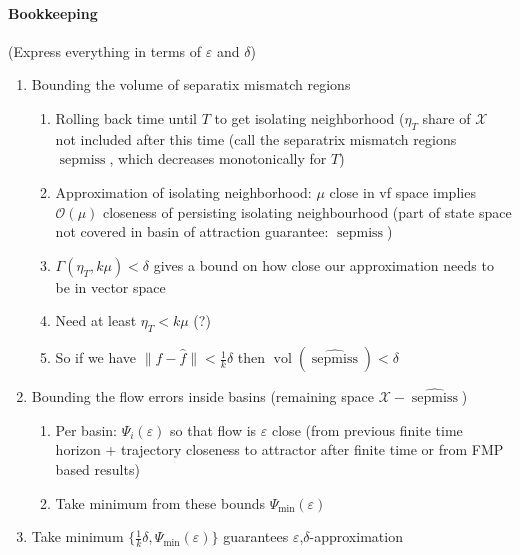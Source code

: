\documentclass{article}
\newcommand{\ascomment}[1]{\textcolor{ascolor}{(#1)}}
\theoremstyle{definition} \newtheorem{definition}{Definition}
\theoremstyle{remark} \newtheorem{remark}{Remark}
\newcommand{\vol}{\operatorname{vol}}
\newcounter{ct}
\begin{document}
\paragraph{Bookkeeping}
\ascomment{Express everything in terms of $\varepsilon$ and $\delta$}
\begin{enumerate}
\item Bounding the volume of separatix mismatch regions
\begin{enumerate}
\item Rolling back time until $T$ to get isolating neighborhood ($\eta_T$ share of $\mathcal{X}$ not included after this time (call the separatrix mismatch regions $\operatorname{sepmiss}$, which decreases monotonically for $T$)
\item Approximation of isolating neighborhood: $\mu$ close in vf space implies $\mathcal{O}(\mu)$ closeness of persisting isolating neighbourhood (part of state space not covered in basin of attraction guarantee: $\widehat{\operatorname{sepmiss}}$)
\item $\Gamma(\eta_T, k\mu) <  \delta$ gives a bound on how close our approximation needs to be in vector space
\item Need at least $\eta_T<k\mu$ (?)
\item So if we have $\| f - \hat f\|<\tfrac{1}{k}\delta$ then $\vol(\widehat{\operatorname{sepmiss}})<\delta$
\end{enumerate}
\item Bounding the flow errors inside basins (remaining space $\mathcal{X}-\widehat{\operatorname{sepmiss}}$)
\begin{enumerate}
\item Per basin: $\Psi_i(\varepsilon)$ so that flow is $\varepsilon$ close (from previous finite time horizon + trajectory closeness to attractor after finite time or from FMP based results)
\item Take minimum from these bounds $\Psi_{\min}(\varepsilon)$
\end{enumerate}
\item Take minimum $\{\tfrac{1}{k}\delta, \Psi_{\min}(\varepsilon)\}$ guarantees $\varepsilon$,$\delta$-approximation
\end{enumerate}
\end{document}
